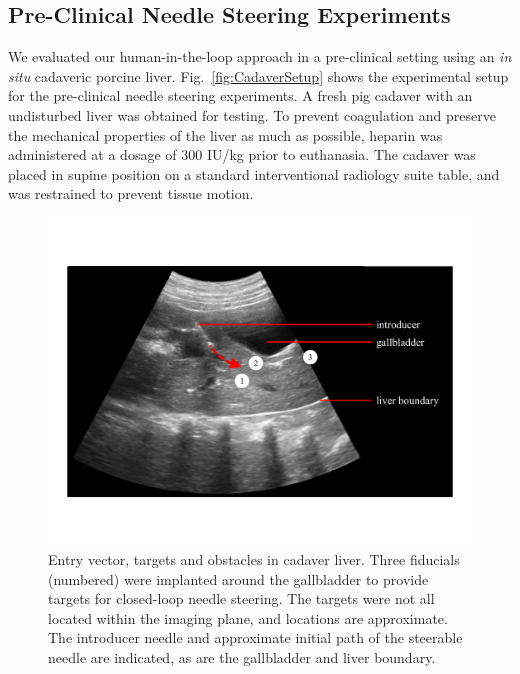 \subsection{Pre-Clinical Needle Steering Experiments}
We evaluated our human-in-the-loop approach in a pre-clinical setting using an \textit{in situ} cadaveric porcine liver. Fig.~\ref{fig:CadaverSetup} shows the experimental setup for the pre-clinical needle steering experiments. A fresh pig cadaver with an undisturbed liver was obtained for testing. To prevent coagulation and preserve the mechanical properties of the liver as much as possible, heparin was administered at a dosage of 300 IU/kg prior to euthanasia. The cadaver was placed in supine position on a standard interventional radiology suite table, and was restrained to prevent tissue motion. 

\begin{figure}[!t]
\centering
\includegraphics[width = \columnwidth]{./Images/Chapter5/CadaverTargetsUS/CadaverTargetsUS.pdf}%
\caption[Entry vector, targets and obstacles in cadaver liver]{Entry vector, targets and obstacles in cadaver liver. Three fiducials (numbered) were implanted around the gallbladder to provide targets for closed-loop needle steering. The targets were not all located within the imaging plane, and locations are approximate. The introducer needle and approximate initial path of the steerable needle are indicated, as are the gallbladder and liver boundary. }
\label{fig:CadaverTargetsUS}
\end{figure} 

